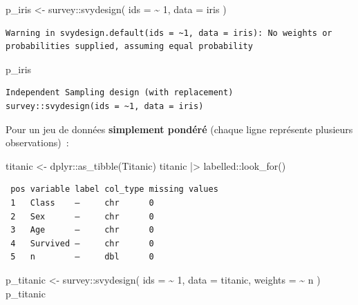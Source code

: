 \documentclass[
  letterpaper,
  DIV=11,
  numbers=noendperiod,
  oneside]{scrreprt}
\newenvironment{Shaded}{\begin{snugshade}}{\end{snugshade}}
\newcommand{\AttributeTok}[1]{\textcolor[rgb]{0.40,0.45,0.13}{#1}}
\newcommand{\DecValTok}[1]{\textcolor[rgb]{0.68,0.00,0.00}{#1}}
\newcommand{\FunctionTok}[1]{\textcolor[rgb]{0.28,0.35,0.67}{#1}}
\newcommand{\NormalTok}[1]{\textcolor[rgb]{0.00,0.23,0.31}{#1}}
\newcommand{\OtherTok}[1]{\textcolor[rgb]{0.00,0.23,0.31}{#1}}
\newcommand{\SpecialCharTok}[1]{\textcolor[rgb]{0.37,0.37,0.37}{#1}}
\begin{document}
\begin{Shaded}
\begin{Highlighting}[]
\NormalTok{p\_iris }\OtherTok{\textless{}{-}}\NormalTok{ survey}\SpecialCharTok{::}\FunctionTok{svydesign}\NormalTok{(}
  \AttributeTok{ids =} \SpecialCharTok{\textasciitilde{}} \DecValTok{1}\NormalTok{, }
  \AttributeTok{data =}\NormalTok{ iris}
\NormalTok{)}
\end{Highlighting}
\end{Shaded}

\begin{verbatim}
Warning in svydesign.default(ids = ~1, data = iris): No weights or
probabilities supplied, assuming equal probability
\end{verbatim}

\begin{Shaded}
\begin{Highlighting}[]
\NormalTok{p\_iris}
\end{Highlighting}
\end{Shaded}

\begin{verbatim}
Independent Sampling design (with replacement)
survey::svydesign(ids = ~1, data = iris)
\end{verbatim}

Pour un jeu de données \textbf{simplement pondéré} (chaque ligne
représente plusieurs observations)~:

\begin{Shaded}
\begin{Highlighting}[]
\NormalTok{titanic }\OtherTok{\textless{}{-}}\NormalTok{ dplyr}\SpecialCharTok{::}\FunctionTok{as\_tibble}\NormalTok{(Titanic)}
\NormalTok{titanic }\SpecialCharTok{|\textgreater{}}\NormalTok{ labelled}\SpecialCharTok{::}\FunctionTok{look\_for}\NormalTok{()}
\end{Highlighting}
\end{Shaded}

\begin{verbatim}
 pos variable label col_type missing values
 1   Class    —     chr      0             
 2   Sex      —     chr      0             
 3   Age      —     chr      0             
 4   Survived —     chr      0             
 5   n        —     dbl      0             
\end{verbatim}

\begin{Shaded}
\begin{Highlighting}[]
\NormalTok{p\_titanic }\OtherTok{\textless{}{-}}\NormalTok{ survey}\SpecialCharTok{::}\FunctionTok{svydesign}\NormalTok{(}
  \AttributeTok{ids =} \SpecialCharTok{\textasciitilde{}} \DecValTok{1}\NormalTok{, }
  \AttributeTok{data =}\NormalTok{ titanic, }
  \AttributeTok{weights =} \SpecialCharTok{\textasciitilde{}}\NormalTok{ n}
\NormalTok{)}
\NormalTok{p\_titanic}
\end{Highlighting}
\end{Shaded}
\end{document}
